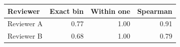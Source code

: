 \begin{tabular}{lrrr}
\toprule
Reviewer & Exact bin & Within one & Spearman \\
\midrule
Reviewer A & 0.77 & 1.00 & 0.91 \\
Reviewer B & 0.68 & 1.00 & 0.79 \\
\bottomrule
\end{tabular}
